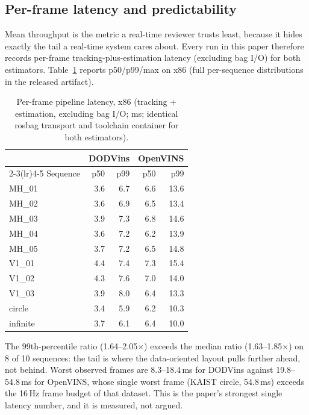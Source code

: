\documentclass[10pt,conference,letterpaper]{IEEEtran}
\begin{document}
\subsection{Per-frame latency and predictability}
\label{sec:latency}

Mean throughput is the metric a real-time reviewer trusts least, because it
hides exactly the tail a real-time system cares about. Every run in this
paper therefore records per-frame tracking-plus-estimation latency
(excluding bag I/O) for both estimators. Table~\ref{tab:latency} reports
p50/p99/max on x86 (full per-sequence distributions in the released
artifact).

\begin{table}[t]
\caption{Per-frame pipeline latency, x86 (tracking + estimation, excluding
bag I/O; ms; identical rosbag transport and toolchain container for both
estimators).}
\label{tab:latency}
\centering
\begin{tabular}{lrrrr}
\toprule
 & \multicolumn{2}{c}{DODVins} & \multicolumn{2}{c}{OpenVINS} \\
\cmidrule(lr){2-3}\cmidrule(lr){4-5}
Sequence & p50 & p99 & p50 & p99 \\
\midrule
MH\_01   & 3.6 & 6.7 & 6.6 & 13.6 \\
MH\_02   & 3.6 & 6.9 & 6.5 & 13.4 \\
MH\_03   & 3.9 & 7.3 & 6.8 & 14.6 \\
MH\_04   & 3.6 & 7.2 & 6.2 & 13.9 \\
MH\_05   & 3.7 & 7.2 & 6.5 & 14.8 \\
V1\_01   & 4.4 & 7.4 & 7.3 & 15.4 \\
V1\_02   & 4.3 & 7.6 & 7.0 & 14.0 \\
V1\_03   & 3.9 & 8.0 & 6.4 & 13.3 \\
circle   & 3.4 & 5.9 & 6.2 & 10.3 \\
infinite & 3.7 & 6.1 & 6.4 & 10.0 \\
\bottomrule
\end{tabular}
\end{table}

The 99th-percentile ratio (1.64--2.05$\times$) exceeds the median ratio
(1.63--1.85$\times$) on 8 of 10 sequences: the tail is where the
data-oriented layout pulls further ahead, not behind. Worst observed frames
are 8.3--18.4\,ms for DODVins against 19.8--54.8\,ms for
OpenVINS, whose single worst frame (KAIST circle, 54.8\,ms) exceeds the
16\,Hz frame budget of that dataset. This is the paper's strongest single
latency number, and it is measured, not argued.
\end{document}
